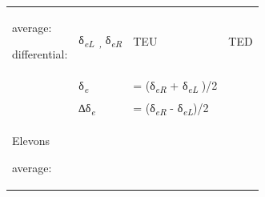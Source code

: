 \documentclass[
]{book}
\begin{document}
\begin{longtable}[]{@{}llll@{}}
\begin{minipage}[t]{0.27\columnwidth}
average:

differential:\strut
\end{minipage} & \begin{minipage}[t]{0.17\columnwidth}\raggedright
δ\emph{\textsubscript{eL~,}} δ\emph{\textsubscript{eR}}\strut
\end{minipage} & \begin{minipage}[t]{0.22\columnwidth}\raggedright
TEU\strut
\end{minipage} & \begin{minipage}[t]{0.22\columnwidth}\raggedright
TED\strut
\end{minipage}\tabularnewline
\begin{minipage}[t]{0.27\columnwidth}\raggedright
\strut
\end{minipage} & \begin{minipage}[t]{0.17\columnwidth}\raggedright
δ\emph{\textsubscript{e}}\strut
\end{minipage} & \begin{minipage}[t]{0.22\columnwidth}\raggedright
= (δ\emph{\textsubscript{eR}} + δ\emph{\textsubscript{eL}} )/2\strut
\end{minipage} & \begin{minipage}[t]{0.22\columnwidth}\raggedright
\strut
\end{minipage}\tabularnewline
\begin{minipage}[t]{0.27\columnwidth}\raggedright
\strut
\end{minipage} & \begin{minipage}[t]{0.17\columnwidth}\raggedright
∆δ\emph{\textsubscript{e}}\strut
\end{minipage} & \begin{minipage}[t]{0.22\columnwidth}\raggedright
= (δ\emph{\textsubscript{eR}} - δ\emph{\textsubscript{eL}})/2\strut
\end{minipage} & \begin{minipage}[t]{0.22\columnwidth}\raggedright
\strut
\end{minipage}\tabularnewline
\begin{minipage}[t]{0.27\columnwidth}\raggedright
Elevons

average:


\end{minipage}
\end{longtable}
\end{document}
